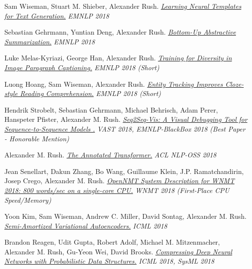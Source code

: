 \documentclass[10pt]{article}
\begin{document}
\medskip


\ind Sam Wiseman, Stuart M. Shieber, Alexander Rush. \emph{\href{ https://arxiv.org/abs/1808.10122 }{ Learning Neural Templates for Text Generation.} }\emph{ EMNLP 2018 }

\medskip


\ind Sebastian Gehrmann, Yuntian Deng, Alexander Rush. \emph{\href{ https://arxiv.org/abs/1808.10792 }{ Bottom-Up Abstractive Summarization.} }\emph{ EMNLP 2018 }

\medskip


\ind Luke Melas-Kyriazi, George Han, Alexander Rush. \emph{\href{ https://www.aclweb.org/anthology/D18-1084 }{ Training for Diversity in Image Paragraph Captioning.} }\emph{ EMNLP 2018 (Short) }

\medskip


\ind Luong Hoang, Sam Wiseman, Alexander Rush. \emph{\href{ https://www.aclweb.org/anthology/D18-1130 }{ Entity Tracking Improves Cloze-style Reading Comprehension.} }\emph{ EMNLP 2018 (Short) }

\medskip


\ind Hendrik Strobelt, Sebastian Gehrmann, Michael Behrisch, Adam Perer, Hanspeter Pfister, Alexander M. Rush. \emph{\href{ https://arxiv.org/abs/1804.09299 }{ Seq2Seq-Vis: A Visual Debugging Tool for Sequence-to-Sequence Models .} }\emph{ VAST 2018, EMNLP-BlackBox 2018 (Best Paper - Honorable Mention) }

\medskip


\ind Alexander M. Rush. \emph{\href{ http://aclweb.org/anthology/W18-2509 }{ The Annotated Transformer.} }\emph{ ACL NLP-OSS 2018 }

\medskip


\ind Jean Senellart, Dakun Zhang, Bo Wang, Guillaume Klein, J.P. Ramatchandirin, Josep Crego, Alexander M. Rush. \emph{\href{ http://aclweb.org/anthology/W18-2715 }{ OpenNMT System Description for WNMT 2018: 800 words/sec on a single-core CPU.} }\emph{ WNMT 2018  (First-Place CPU Speed/Memory) }

\medskip


\ind Yoon Kim, Sam Wiseman, Andrew C. Miller, David Sontag, Alexander M. Rush. \emph{\href{ https://arxiv.org/abs/1802.02550 }{ Semi-Amortized Variational Autoencoders.} }\emph{ ICML 2018 }

\medskip


\ind Brandon Reagen, Udit Gupta, Robert Adolf, Michael M. Mitzenmacher, Alexander M. Rush, Gu-Yeon Wei, David Brooks. \emph{\href{ https://www.sysml.cc/doc/68.pdf }{ Compressing Deep Neural Networks with Probabilistic Data Structures.} }\emph{ ICML 2018, SysML 2018 }
\end{document}
